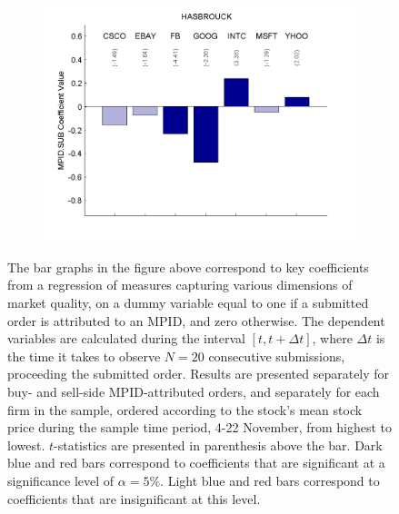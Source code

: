 \documentclass{article}
\begin{document}
\begin{figure}[htp!]
\begin{subfigure}{0.31\textwidth}
\includegraphics[width=\linewidth]{docs/Regression_Ratio_30sec_26_MPID_SUB_1MPIDLags_5DepVarLags.pdf}
\end{subfigure}

\begin{minipage}{\textwidth}
\footnotesize
The bar graphs in the figure above correspond to key coefficients from a regression of measures capturing various dimensions of market quality, on a dummy variable equal to one if a submitted order is attributed to an MPID, and zero otherwise. The dependent variables are calculated during the interval $[t, t+\Delta t]$, where $\Delta t$ is the time it takes to observe $N=20$ consecutive submissions, proceeding the submitted order. Results are presented separately for buy- and sell-side MPID-attributed orders, and separately for each firm in the sample, ordered according to the stock's mean stock price during the sample time period, 4-22 November, from highest to lowest. $t$-statistics are presented in parenthesis above the bar. Dark blue and red bars correspond to coefficients that are significant at a significance level of $\alpha=5\%$. Light blue and red bars correspond to coefficients that are insignificant at this level.
\end{minipage}
\end{figure}
\end{document}
